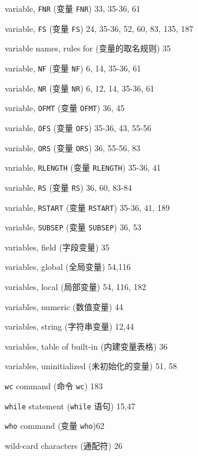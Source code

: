 \begin{multicols}{2}
\hangindent=2pc  variable, \verb'FNR' (变量 \verb'FNR') 33, 35-36, 61

\hangindent=2pc  variable, \verb'FS' (变量 \verb'FS')
24, 35-36, 52, 60, 83, 135, 187

\hangindent=2pc  variable names, rules for (变量的取名规则) 35

\hangindent=2pc  variable, \verb'NF' (变量 \verb'NF')
6, 14, 35-36, 61

\hangindent=2pc  variable, \verb'NR' (变量 \verb'NR')
6, 12, 14, 35-36, 61

\hangindent=2pc  variable, \verb'OFMT' (变量 \verb'OFMT') 36, 45

\hangindent=2pc  variable, \verb'OFS' (变量 \verb'OFS')
35-36, 43, 55-56

\hangindent=2pc  variable, \verb'ORS' (变量 \verb'ORS') 36, 55-56, 83

\hangindent=2pc  variable, \verb'RLENGTH' (变量 \verb'RLENGTH')
35-36, 41

\hangindent=2pc  variable, \verb'RS' (变量 \verb'RS') 36, 60, 83-84

\hangindent=2pc  variable, \verb'RSTART' (变量 \verb'RSTART')
35-36, 41, 189

\hangindent=2pc  variable, \verb'SUBSEP' (变量 \verb'SUBSEP') 36, 53

\hangindent=2pc  variables, field (字段变量) 35

\hangindent=2pc  variables, global (全局变量) 54,116

\hangindent=2pc  variables, local (局部变量) 54, 116, 182

\hangindent=2pc  variables, numeric (数值变量) 44

\hangindent=2pc  variables, string (字符串变量) 12,44

\hangindent=2pc  variables, table of built-in (内建变量表格) 36

\hangindent=2pc  variables, uninitialized (未初始化的变量) 51, 58

\hangindent=2pc  \verb'wc' command (命令 \verb'wc') 183

\hangindent=2pc  \verb'while' statement (\verb'while' 语句) 15,47

\hangindent=2pc  \verb'who' command (变量 \verb'who')62

\hangindent=2pc  wild-card characters (通配符) 26


\end{multicols}
